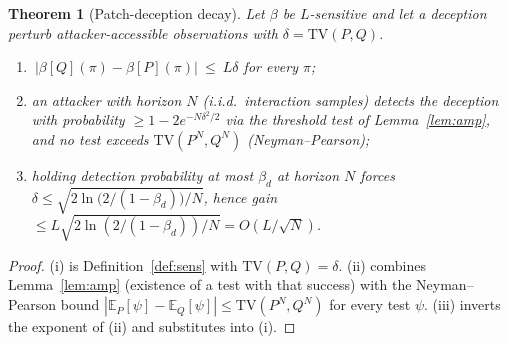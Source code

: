 \documentclass[11pt]{article}
\newtheorem{theorem}{Theorem}
\newcommand{\E}{\mathbb{E}}
\begin{document}
\begin{theorem}[Patch-deception decay]\label{thm:patch}
Let $\beta$ be $L$-sensitive and let a deception perturb attacker-accessible observations with $\delta=\mathrm{TV}(P,Q)$.
\begin{enumerate}[nosep]
\item[(i)] $\ |\beta[Q](\pi)-\beta[P](\pi)|\ \le\ L\delta$ for every $\pi$;
\item[(ii)] an attacker with horizon $N$ (i.i.d.\ interaction samples) detects the deception with probability $\ge 1-2e^{-N\delta^2/2}$ via the threshold test of Lemma~\ref{lem:amp}, and \emph{no} test exceeds $\mathrm{TV}(P^N,Q^N)$ (Neyman--Pearson);
\item[(iii)] holding detection probability at most $\beta_d$ at horizon $N$ forces $\delta\le\sqrt{2\ln\!\bigl(2/(1-\beta_d)\bigr)/N}$, hence gain $\le L\sqrt{2\ln(2/(1-\beta_d))/N}=O(L/\sqrt{N})$.
\end{enumerate}
\end{theorem}
\begin{proof}
(i) is Definition~\ref{def:sens} with $\mathrm{TV}(P,Q)=\delta$. (ii) combines Lemma~\ref{lem:amp} (existence of a test with that success) with the Neyman--Pearson bound $|\E_P[\psi]-\E_Q[\psi]|\le\mathrm{TV}(P^N,Q^N)$ for every test $\psi$. (iii) inverts the exponent of (ii) and substitutes into (i).
\end{proof}
\end{document}
